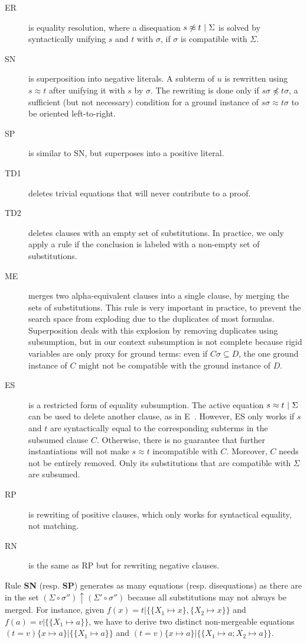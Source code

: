 \begin{description}
\item[ER] is equality resolution, where a disequation
$s \not\approx t ~|~ \Sigma$ is solved by syntactically unifying
$s$ and $t$ with $\sigma$, if $\sigma$ is compatible with $\Sigma$.
\item[SN] is superposition into negative literals. A subterm of $u$ is rewritten
using $s \approx t$ after unifying it with $s$ by $\sigma$. The rewriting is
done only if $s\sigma \not\preceq t\sigma$, a sufficient (but not necessary)
condition for a ground instance of $s\sigma \approx t\sigma$ to be oriented
left-to-right.
\item[SP] is similar to SN, but superposes into a positive literal.
\item[TD1] deletes trivial equations that will never contribute to a proof.
\item[TD2] deletes clauses with an empty set of substitutions. In practice, we
only apply a rule if the conclusion is labeled with a non-empty set of
substitutions.
\item[ME] merges two alpha-equivalent clauses into a single clause, by merging
the sets of substitutions. This rule is very important in practice, to prevent
the search space from exploding due to the duplicates of most formulas.
Superposition deals with this explosion by removing duplicates using
subsumption, but in our context subsumption is not complete because rigid
variables are only proxy for ground terms: even if $C\sigma \subseteq D$, the
one ground instance of $C$ might not be compatible with the ground instance of
$D$.
\item[ES] is a restricted form of equality subsumption. The active equation
$ s\approx t ~|~ \Sigma $ can be used to delete another clause, as
in E~\cite{SS02}. However, ES only works if $s$ and $t$ are syntactically equal
to the corresponding subterms in the subsumed clause $C$. Otherwise, there is no
guarantee that further instantiations will not make $s\approx t$ incompatible
with $C$. Moreover, $C$ needs not be entirely removed. Only its substitutions
that are compatible with $\Sigma$ are subsumed.
\item[RP] is rewriting of positive clauses, which only works for syntactical
equality, not matching.
\item[RN] is the same as RP but for rewriting negative clauses.
\end{description}

Rule \textbf{SN} (resp. \textbf{SP}) generates as many equations (resp.
disequations) as there are in the set
$(\Sigma \circ \sigma'') \uparrow (\Sigma' \circ \sigma'')$ because all
substitutions may not always be merged. For instance, given
$f(x) = t | \{ \{ X_1 \mapsto x \}, \{ X_2 \mapsto x \} \}$ and
$f(a) = v | \{ \{ X_1 \mapsto a \} \}$, we have to derive two distinct
non-mergeable equations $(t = v)\{ x \mapsto a \} | \{ \{ X_1 \mapsto a \} \}$
and $(t = v)\{ x \mapsto a \} | \{ \{ X_1 \mapsto a; X_2 \mapsto a \} \}$.

